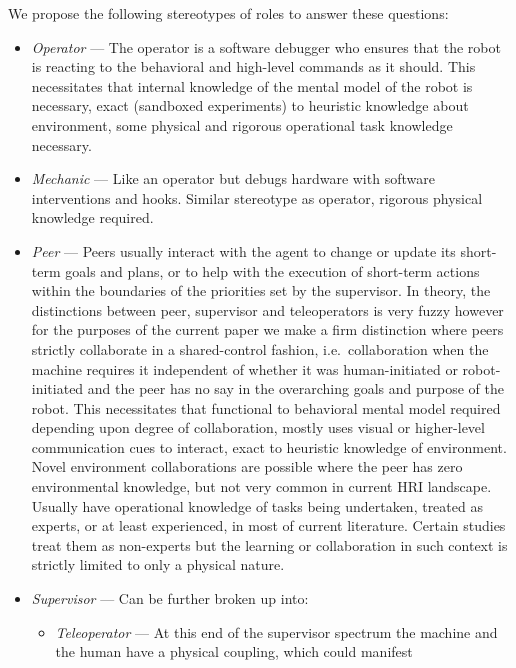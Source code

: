\documentclass[letterpaper, 10 pt, conference]{ieeeconf} %
\theoremstyle{definition} \newtheorem{definition}{Definition}
\begin{document}
We propose the following stereotypes of roles to answer these questions:
\begin{itemize}{}
  \item \textit{Operator} --- The operator is a software debugger who ensures
        that the robot is reacting to the behavioral and high-level commands as it
        should. This necessitates that internal knowledge of the mental model of the
        robot is necessary, exact (sandboxed experiments) to heuristic knowledge
        about environment, some physical and rigorous operational task knowledge
        necessary.
  \item \textit{Mechanic} --- Like an operator but debugs hardware with software
        interventions and hooks. Similar stereotype as operator, rigorous physical
        knowledge required.
  \item \textit{Peer} --- Peers usually interact with the agent to change or
        update its short-term goals and plans, or to help with the execution of
        short-term actions within the boundaries of the priorities set by the
        supervisor. In theory, the distinctions between peer, supervisor and
        teleoperators is very fuzzy however for the purposes of the current paper we
        make a firm distinction where peers strictly collaborate in a shared-control
        fashion, i.e.\ collaboration when the machine requires it independent of
        whether it was human-initiated or robot-initiated and the peer has no say in
        the overarching goals and purpose of the robot. This necessitates that
        functional to behavioral mental model required depending upon degree of
        collaboration, mostly uses visual or higher-level communication cues to
        interact, exact to heuristic knowledge of environment. Novel environment
        collaborations are possible where the peer has zero environmental knowledge,
        but not very common in current HRI landscape. Usually have operational
        knowledge of tasks being undertaken, treated as experts, or at least
        experienced, in most of current literature. Certain studies treat them as
        non-experts but the learning or collaboration in such context is strictly
        limited to only a physical nature.
  \item \textit{Supervisor} --- Can be further broken up into:
        \begin{itemize}{}
          \item \textit{Teleoperator} --- At this end of the supervisor spectrum the
                machine and the human have a physical coupling, which could manifest

\end{itemize}
\end{itemize}
\end{document}
